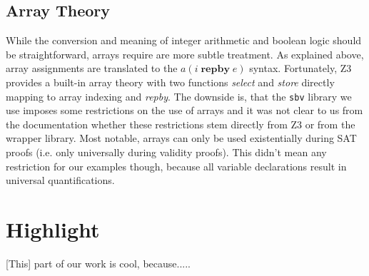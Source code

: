 \documentclass[]{scrartcl}
\newcommand{\REPBY}[2]{\ensuremath{#1\;\mathbf{repby}\;#2}}
\begin{document}
\subsection{Array Theory}

While the conversion and meaning of integer arithmetic and boolean logic should be
straightforward, arrays require are more subtle treatment.
As explained above, array assignments are translated to the $a(\REPBY{i}{e})$ syntax.
Fortunately, Z3 provides a built-in array theory with two functions \emph{select} and
\emph{store} directly mapping to array indexing and \emph{repby}.
The downside is, that the \texttt{sbv} library we use imposes some restrictions on the
use of arrays and it was not clear to us from the documentation whether these restrictions
stem directly from Z3 or from the wrapper library.
Most notable, arrays can only be used existentially during SAT proofs (i.e. only universally
during validity proofs).
This didn't mean any restriction for our examples though, because all variable declarations
result in universal quantifications.

\section{Highlight}

[This] part of our work is cool, because.....
\end{document}
